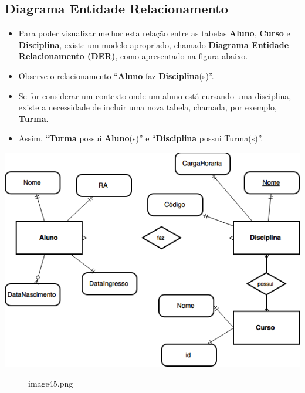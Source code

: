 \documentclass[12pt,a4paper]{article}
\begin{document}
    \hypertarget{diagrama-entidade-relacionamento}{%
\subsection{Diagrama Entidade
Relacionamento}\label{diagrama-entidade-relacionamento}}

    \begin{itemize}
\item
  Para poder visualizar melhor esta relação entre as tabelas
  \textbf{Aluno}, \textbf{Curso} e \textbf{Disciplina}, existe um modelo
  apropriado, chamado \textbf{Diagrama Entidade Relacionamento (DER)},
  como apresentado na figura abaixo.
\item
  Observe o relacionamento ``\textbf{Aluno} faz
  \textbf{Disciplina}(s)''.
\item
  Se for considerar um contexto onde um aluno está cursando uma
  disciplina, existe a necessidade de incluir uma nova tabela, chamada,
  por exemplo, \textbf{Turma}.
\item
  Assim, ``\textbf{Turma} possui \textbf{Aluno}(s)'' e
  ``\textbf{Disciplina} possui Turma(s)''.
\end{itemize}

\includegraphics{"figs/image45.png"}

    \begin{figure}
\centering
\caption{image45.png}
\end{figure}
\end{document}
